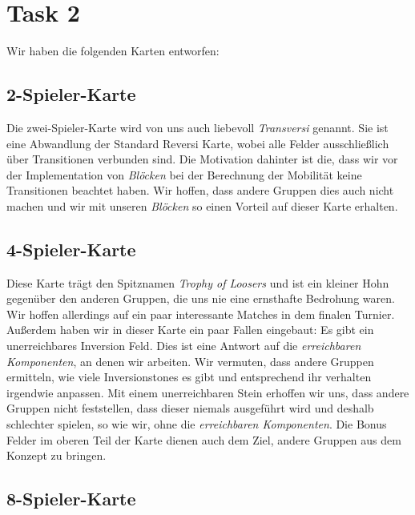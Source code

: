 \section{Task 2}
Wir haben die folgenden Karten entworfen:

\subsection{2-Spieler-Karte}
Die zwei-Spieler-Karte wird von uns auch liebevoll \textit{Transversi} genannt. Sie ist eine Abwandlung der Standard Reversi Karte, wobei alle Felder ausschließlich über Transitionen verbunden sind. Die Motivation dahinter ist die, dass wir vor der Implementation von \textit{Blöcken} bei der Berechnung der Mobilität keine Transitionen beachtet haben. Wir hoffen, dass andere Gruppen dies auch nicht machen und wir mit unseren \textit{Blöcken} so einen Vorteil auf dieser Karte erhalten.

\subsection{4-Spieler-Karte}
Diese Karte trägt den Spitznamen \textit{Trophy of Loosers} und ist ein kleiner Hohn gegenüber den anderen Gruppen, die uns nie eine ernsthafte Bedrohung waren. Wir hoffen allerdings auf ein paar interessante Matches in dem finalen Turnier. Außerdem haben wir in dieser Karte ein paar Fallen eingebaut: Es gibt ein unerreichbares Inversion Feld. Dies ist eine Antwort auf die \textit{erreichbaren Komponenten}, an denen wir arbeiten. Wir vermuten, dass andere Gruppen ermitteln, wie viele Inversionstones es gibt und entsprechend ihr verhalten irgendwie anpassen. Mit einem unerreichbaren Stein erhoffen wir uns, dass andere Gruppen nicht feststellen, dass dieser niemals ausgeführt wird und deshalb schlechter spielen, so wie wir, ohne die \textit{erreichbaren Komponenten}. Die Bonus Felder im oberen Teil der Karte dienen auch dem Ziel, andere Gruppen aus dem Konzept zu bringen.

\subsection{8-Spieler-Karte}
